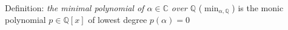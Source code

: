 \documentclass[preview]{standalone}
\begin{document}
\begin{center}
Definition: \textit{the minimal polynomial of $\alpha \in \mathbb{C}$ over $\mathbb{Q}$} ($\min_{\alpha, \mathbb{Q}}$) is the monic polynomial $p \in \mathbb{Q}[x]$ of lowest degree $p(\alpha) = 0$
\end{center}
\end{document}
